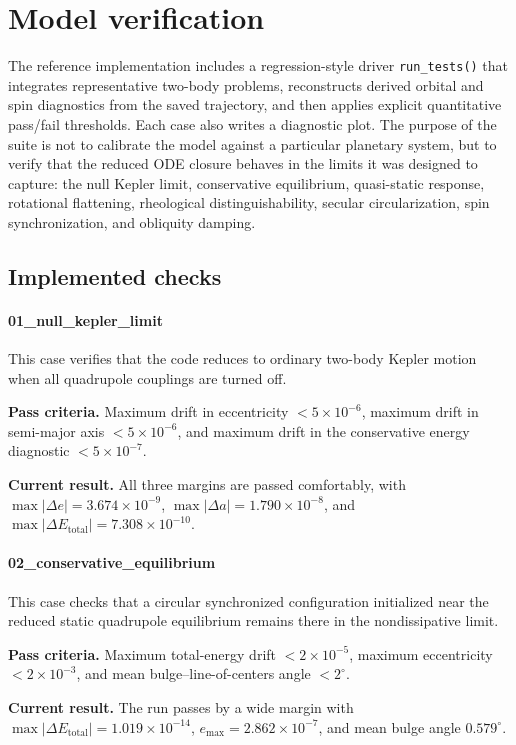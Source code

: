 \documentclass[journal, a4paper]{IEEEtran}
\begin{document}
\section{Model verification}

The reference implementation includes a regression-style driver
\texttt{run\_tests()} that integrates representative two-body problems,
reconstructs derived orbital and spin diagnostics from the saved trajectory,
and then applies explicit quantitative pass/fail thresholds. Each case also
writes a diagnostic plot. The purpose of the suite is not to calibrate the
model against a particular planetary system, but to verify that the reduced ODE
closure behaves in the limits it was designed to capture: the null Kepler
limit, conservative equilibrium, quasi-static response, rotational
flattening, rheological distinguishability, secular circularization, spin
synchronization, and obliquity damping.

\subsection{Implemented checks}

\paragraph{01\_null\_kepler\_limit}
This case verifies that the code reduces to ordinary two-body Kepler motion
when all quadrupole couplings are turned off.
\par\smallskip
\textbf{Pass criteria.} Maximum drift in eccentricity $<5\times10^{-6}$,
maximum drift in semi-major axis $<5\times10^{-6}$, and maximum drift in the
conservative energy diagnostic $<5\times10^{-7}$.
\par\smallskip
\textbf{Current result.} All three margins are passed comfortably, with
$\max|\Delta e|=3.674\times10^{-9}$,
$\max|\Delta a|=1.790\times10^{-8}$, and
$\max|\Delta E_{\mathrm{total}}|=7.308\times10^{-10}$.

\paragraph{02\_conservative\_equilibrium}
This case checks that a circular synchronized configuration initialized near
the reduced static quadrupole equilibrium remains there in the nondissipative
limit.
\par\smallskip
\textbf{Pass criteria.} Maximum total-energy drift $<2\times10^{-5}$,
maximum eccentricity $<2\times10^{-3}$, and mean bulge--line-of-centers angle
$<2^\circ$.
\par\smallskip
\textbf{Current result.} The run passes by a wide margin with
$\max|\Delta E_{\mathrm{total}}|=1.019\times10^{-14}$,
$e_{\max}=2.862\times10^{-7}$, and mean bulge angle $0.579^\circ$.
\end{document}
